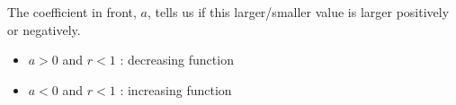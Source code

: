 \documentclass{ximera}
\begin{document}
\begin{observation}
The coefficient in front, $a$, tells us if this larger/smaller value is larger positively or negatively.


\begin{itemize}
\item $a > 0$ and $r < 1$ : decreasing function
\item $a < 0$ and $r < 1$ : increasing function  
\end{itemize}



\end{observation}
\end{document}
